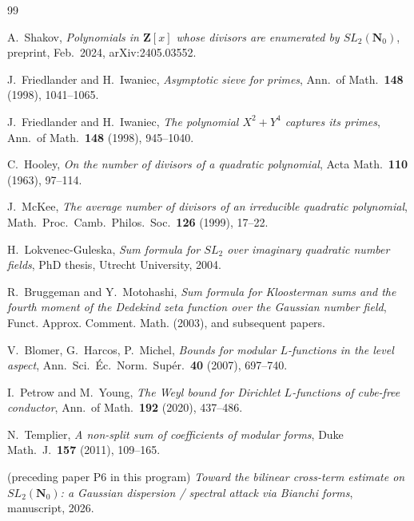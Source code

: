 \documentclass[11pt]{article}
\theoremstyle{definition}
\newcommand{\Nz}{\mathbf{N}_0}
\newcommand{\Z}{\mathbf{Z}}
\newcommand{\SLNz}{SL_2(\Nz)}
\begin{document}
\begin{thebibliography}{99}

 A.~Shakov, \emph{Polynomials in $\Z[x]$ whose divisors are enumerated by $\SLNz$}, preprint, Feb.\ 2024, arXiv:2405.03552.

 J.~Friedlander and H.~Iwaniec, \emph{Asymptotic sieve for primes}, Ann.\ of Math.\ \textbf{148} (1998), 1041--1065.

 J.~Friedlander and H.~Iwaniec, \emph{The polynomial $X^2+Y^4$ captures its primes}, Ann.\ of Math.\ \textbf{148} (1998), 945--1040.

 C.~Hooley, \emph{On the number of divisors of a quadratic polynomial}, Acta Math.\ \textbf{110} (1963), 97--114.

 J.~McKee, \emph{The average number of divisors of an irreducible quadratic polynomial}, Math.\ Proc.\ Camb.\ Philos.\ Soc.\ \textbf{126} (1999), 17--22.

 H.~Lokvenec-Guleska, \emph{Sum formula for $SL_2$ over imaginary quadratic number fields}, PhD thesis, Utrecht University, 2004.

 R.~Bruggeman and Y.~Motohashi, \emph{Sum formula for Kloosterman sums and the fourth moment of the Dedekind zeta function over the Gaussian number field}, Funct. Approx. Comment. Math. (2003), and subsequent papers.

 V.~Blomer, G.~Harcos, P.~Michel, \emph{Bounds for modular $L$-functions in the level aspect}, Ann.\ Sci.\ \'Ec.\ Norm.\ Sup\'er.\ \textbf{40} (2007), 697--740.

 I.~Petrow and M.~Young, \emph{The Weyl bound for Dirichlet $L$-functions of cube-free conductor}, Ann.\ of Math.\ \textbf{192} (2020), 437--486.

 N.~Templier, \emph{A non-split sum of coefficients of modular forms}, Duke Math.\ J.\ \textbf{157} (2011), 109--165.

 (preceding paper P6 in this program) \emph{Toward the bilinear cross-term estimate on $\SLNz$: a Gaussian dispersion / spectral attack via Bianchi forms}, manuscript, 2026.

\end{thebibliography}
\end{document}
